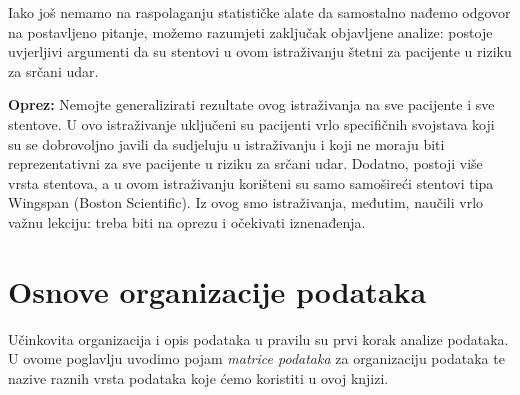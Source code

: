 Iako još nemamo na raspolaganju statističke alate da samostalno nađemo odgovor na postavljeno pitanje, možemo razumjeti zaključak objavljene analize: postoje uvjerljivi argumenti da su stentovi u ovom istraživanju štetni za pacijente u riziku za srčani udar.


\textbf{Oprez:}
Nemojte generalizirati rezultate ovog istraživanja na sve pacijente
i sve stentove.
U ovo istraživanje uključeni su pacijenti vrlo specifičnih svojstava koji su se dobrovoljno javili da sudjeluju u istraživanju i koji ne moraju biti reprezentativni za sve pacijente u riziku za srčani udar.
Dodatno, postoji više vrsta stentova, a u ovom istraživanju
korišteni su samo samošireći stentovi tipa Wingspan (Boston Scientific).
Iz ovog smo istraživanja, međutim, naučili vrlo važnu lekciju:
treba biti na oprezu i očekivati iznenađenja.


%

{}


\section{Osnove organizacije podataka}


\label{dataBasics}

Učinkovita organizacija i opis podataka u pravilu su prvi korak analize podataka.
U ovome poglavlju uvodimo pojam \emph{matrice podataka} za organizaciju podataka te nazive raznih vrsta podataka koje ćemo koristiti u ovoj knjizi.

